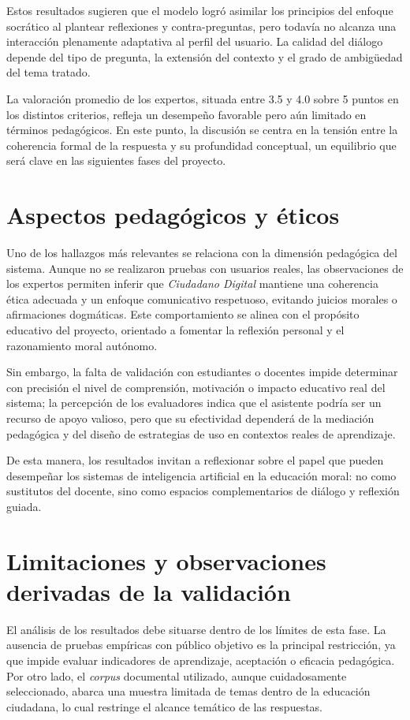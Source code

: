Estos resultados sugieren que el modelo logró asimilar los principios del
enfoque socrático al plantear reflexiones y contra-preguntas, pero todavía no
alcanza una interacción plenamente adaptativa al perfil del usuario. La calidad
del diálogo depende del tipo de pregunta, la extensión del contexto y el grado
de ambigüedad del tema tratado.

La valoración promedio de los expertos, situada entre 3.5 y 4.0 sobre 5 puntos
en los distintos criterios, refleja un desempeño favorable pero aún limitado en
términos pedagógicos. En este punto, la discusión se centra en la tensión entre
la coherencia formal de la respuesta y su profundidad conceptual, un equilibrio
que será clave en las siguientes fases del proyecto.

\section{Aspectos pedagógicos y éticos}
Uno de los hallazgos más relevantes se relaciona con la dimensión pedagógica
del sistema. Aunque no se realizaron pruebas con usuarios reales, las
observaciones de los expertos permiten inferir que \textit{Ciudadano Digital}
mantiene una coherencia ética adecuada y un enfoque comunicativo respetuoso,
evitando juicios morales o afirmaciones dogmáticas. Este comportamiento se
alinea con el propósito educativo del proyecto, orientado a fomentar la
reflexión personal y el razonamiento moral autónomo.

Sin embargo, la falta de validación con estudiantes o docentes impide
determinar con precisión el nivel de comprensión, motivación o impacto
educativo real del sistema; la percepción de los evaluadores indica que el
asistente podría ser un recurso de apoyo valioso, pero que su efectividad
dependerá de la mediación pedagógica y del diseño de estrategias de uso en
contextos reales de aprendizaje.

De esta manera, los resultados invitan a reflexionar sobre el papel que pueden
desempeñar los sistemas de inteligencia artificial en la educación moral: no
como sustitutos del docente, sino como espacios complementarios de diálogo y
reflexión guiada.

\section{Limitaciones y observaciones derivadas de la validación}
El análisis de los resultados debe situarse dentro de los límites de esta fase.
La ausencia de pruebas empíricas con público objetivo es la principal
restricción, ya que impide evaluar indicadores de aprendizaje, aceptación o
eficacia pedagógica. Por otro lado, el \textit{corpus} documental utilizado,
aunque cuidadosamente seleccionado, abarca una muestra limitada de temas dentro
de la educación ciudadana, lo cual restringe el alcance temático de las
respuestas.

